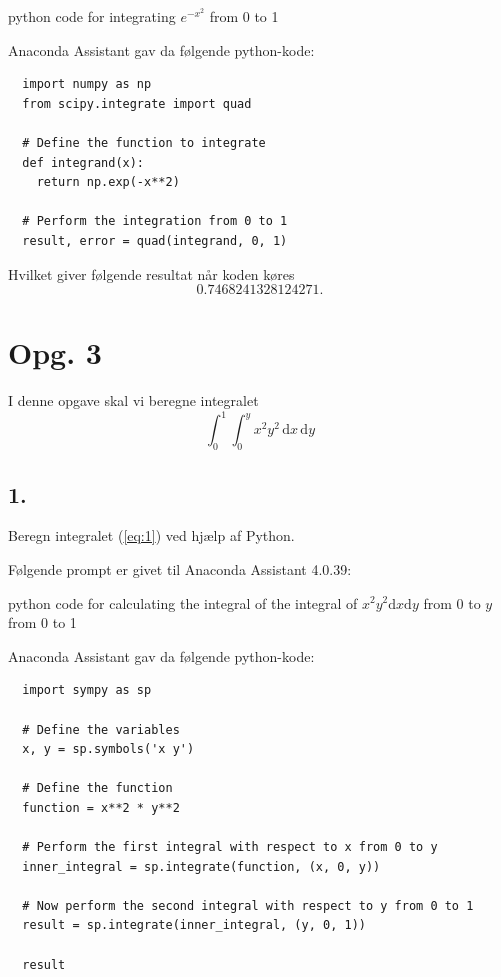 \documentclass[12pt]{article}
\theoremstyle{definition}
\begin{document}
\begin{blueline}
  python code for integrating $e^{-x^2}$ from 0 to 1
\end{blueline}

Anaconda Assistant gav da følgende python-kode:
\begin{verbatim}
  import numpy as np
  from scipy.integrate import quad

  # Define the function to integrate
  def integrand(x):
    return np.exp(-x**2)

  # Perform the integration from 0 to 1
  result, error = quad(integrand, 0, 1)
\end{verbatim}

Hvilket giver følgende resultat når koden køres
\[ 
  \num{0.7468241328124271} 
.\]


\section*{Opg. 3}
I denne opgave skal vi beregne integralet
\begin{equation} \label{eq:1}
  \int_{0}^{1} \int_{0}^{y} x^2y^2 \, \mathrm{d}x \, \mathrm{d}y
\end{equation}

\subsection*{1.}
Beregn integralet (\ref{eq:1}) ved hjælp af Python.

Følgende prompt er givet til Anaconda Assistant 4.0.39: 

\begin{blueline}
  python code for calculating the integral of the integral of $x^2y^2 \mathrm{d}x \mathrm{d}y$ from 0 to $y$ from 0 to 1
\end{blueline}

Anaconda Assistant gav da følgende python-kode:
\begin{verbatim}
  import sympy as sp

  # Define the variables
  x, y = sp.symbols('x y')

  # Define the function
  function = x**2 * y**2

  # Perform the first integral with respect to x from 0 to y
  inner_integral = sp.integrate(function, (x, 0, y))

  # Now perform the second integral with respect to y from 0 to 1
  result = sp.integrate(inner_integral, (y, 0, 1))

  result
\end{verbatim}
\end{document}
